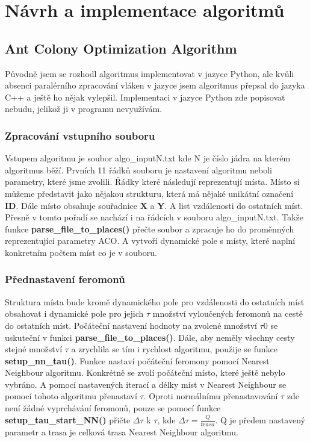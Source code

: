 \chapter{Návrh a implementace algoritmů}
\section{Ant Colony Optimization Algorithm}
Původně jsem se rozhodl algoritmus implementovat v jazyce Python, ale kvůli absenci paralérního zpracování vláken v jazyce jsem algoritmus přepsal do jazyka C++ a ještě ho nějak vylepšil. Implementaci v jazyce Python zde popisovat nebudu, jelikož ji v programu nevyužívám.  
\subsection{Zpracování vstupního souboru}\label{sec:start file}
Vstupem algoritmu je soubor algo\_inputN.txt kde N je číslo jádra na kterém algoritmus běží.
Prvních 11 řádků souboru je nastavení algoritmu neboli parametry, které jsme zvolili. Řádky které následují reprezentují místa. Místo si můžeme představit jako nějakou strukturu, která má nějaké unikátní označení \textbf{ID}. Dále místo obsahuje souřadnice \textbf{X} a \textbf{Y}. 
A list vzdálenosti do ostatních míst. Přesně v tomto pořadí se nachází i na řádcích v souboru algo\_inputN.txt. Takže funkce \textbf{parse\_file\_to\_places()} přečte soubor a zpracuje ho do proměnných reprezentující parametry ACO. A vytvoří dynamické pole s místy, které naplní konkretním počtem míst co je v souboru.  
\subsection{Přednastavení feromonů}
Struktura místa bude kromě dynamického pole pro vzdálenosti do ostatních míst obsahovat i dynamické pole pro jejich $\tau$ množství vyloučených feromonů na cestě do ostatních míst. Počáteční nastavení hodnoty na zvolené množství $\tau0$ se uskuteční v funkci \textbf{parse\_file\_to\_places()}. Dále, aby neměly všechny cesty stejné množství $\tau$ a zrychlila se tím i rychlost algoritmu, použije se funkce \textbf{setup\_nn\_tau()}. Funkce nastaví počáteční feromony pomocí Nearest Neighbour algoritmu. Konkrétně se zvolí počáteční místo, které ještě nebylo vybráno. A pomocí nastavených iterací a délky míst v Nearest Neighbour se pomocí tohoto algoritmu přenastaví $\tau$. Oproti normálnímu přenastavování $\tau$ zde není žádné vyprchávání feromonů, pouze se pomocí funkce \textbf{setup\_tau\_start\_NN()} přičte $\Delta\tau$ k $\tau$, kde $\Delta\tau = \frac{Q}{trasa}$. Q je předem nastavený parametr a trasa je celková trasa Nearest Neighbour algoritmu.
